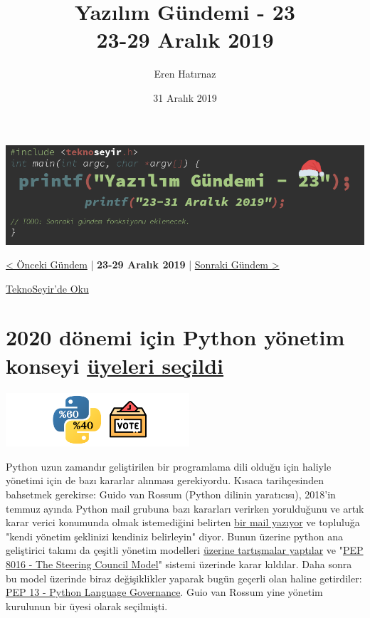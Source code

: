 \documentclass[11pt]{article}
\author{Eren Hatırnaz}
\date{31 Aralık 2019}
\title{Yazılım Gündemi - 23\\\medskip
\large 23-29 Aralık 2019}
\begin{document}
\maketitle
\tableofcontents \clearpage\shorthandoff{=}

\begin{center}
\includegraphics[width=.9\linewidth]{gorseller/yazilim-gundemi-banner.png}
\end{center}

\begin{center}
\href{../22/yazilim-gundemi-22.pdf}{< Önceki Gündem} | \textbf{23-29 Aralık 2019} | \href{../../2020/01/yazilim-gundemi-2020-01.pdf}{Sonraki Gündem >}

\href{https://teknoseyir.com/blog/yazilim-gundemi-23-23-31-aralik-2019}{TeknoSeyir'de Oku}
\end{center}

\section{2020 dönemi için Python yönetim konseyi \href{https://www.python.org/dev/peps/pep-8101/}{üyeleri seçildi}}
\label{sec:org4d4487c}
\begin{center}
\includegraphics[height=2cm]{gorseller/python-yonetim-konseyi.png}
\end{center}

Python uzun zamandır geliştirilen bir programlama dili olduğu için haliyle
yönetimi için de bazı kararlar alınması gerekiyordu. Kısaca tarihçesinden
bahsetmek gerekirse: Guido van Rossum (Python dilinin yaratıcısı), 2018'in
temmuz ayında Python mail grubuna bazı kararları verirken yorulduğunu ve artık
karar verici konumunda olmak istemediğini belirten \href{https://mail.python.org/pipermail/python-committers/2018-July/005664.html}{bir mail yazıyor} ve
topluluğa "kendi yönetim şeklinizi kendiniz belirleyin" diyor. Bunun üzerine
python ana geliştirici takımı da çeşitli yönetim modelleri \href{https://www.python.org/dev/peps/pep-8000/}{üzerine tartışmalar
yaptılar} ve "\href{https://www.python.org/dev/peps/pep-8016/}{PEP 8016 - The Steering Council Model}" sistemi üzerinde karar
kıldılar. Daha sonra bu model üzerinde biraz değişiklikler yaparak bugün
geçerli olan haline getirdiler: \href{https://www.python.org/dev/peps/pep-0013/}{PEP 13 - Python Language Governance}. Guio van
Rossum yine yönetim kurulunun bir üyesi olarak seçilmişti.
\end{document}
